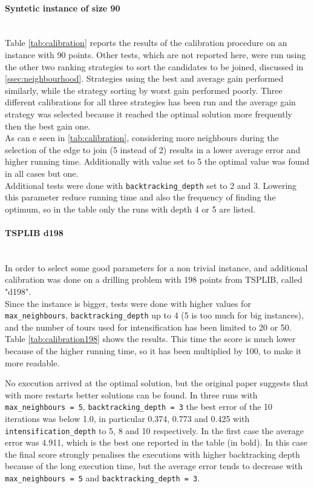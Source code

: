 \paragraph{Syntetic instance of size 90}\mbox{}\\
Table \ref{tab:calibration} reports the results of the calibration procedure on an instance with 90 points.
Other tests, which are not reported here, were run using the other two ranking strategies to sort the candidates to be joined, discussed in \cref{ssec:neighbourhood}. Strategies using the best and average gain performed similarly, while the strategy sorting by worst gain performed poorly. Three different calibrations for all three strategies has been run and the average gain strategy was selected because it reached the optimal solution more frequently then the best gain one.\\
As can e seen in \cref{tab:calibration}, considering more neighbours during the selection of the edge to join (5 instead of 2) results in a lower average error and higher running time. Additionally with value set to 5 the optimal value was found in all cases but one.\\
Additional tests were done with \texttt{backtracking\_depth} set to 2 and 3. Lowering this parameter reduce running time and also the frequency of finding the optimum, so in the table only the runs with depth 4 or 5 are listed.\\


\paragraph{TSPLIB d198}\mbox{}\\
In order to select some good parameters for a non trivial instance, and additional calibration was done on a drilling problem with 198 points from TSPLIB, called "d198".\\
Since the instance is bigger, tests were done with higher values for \texttt{max\_neighbours}, \texttt{back\-track\-ing\_depth} up to 4 (5 is too much for big instances), and the number of tours used for intensification has been limited to 20 or 50. Table \ref{tab:calibration198} shows the results. This time the score is much lower because of the higher running time, so it has been multiplied by 100, to make it more readable.

\clearpage
{}

No execution arrived at the optimal solution, but the original paper suggests that with more restarts better solutions can be found. In three runs with \texttt{max\_neighbours = 5}, \texttt{back\-track\-ing\_depth = 3} the best error of the 10 iterations was below 1.0, in particular 0.374, 0.773 and 0.425 with \texttt{intensification\_depth} to 5, 8 and 10 respectively. In the first case the average error was 4.911, which is the best one reported in the table (in bold). In this case the final score strongly penalises the executions with higher backtracking depth because of the long execution time, but the average error tends to decrease with \texttt{max\_neighbours = 5} and \texttt{back\-track\-ing\_depth = 3}.
